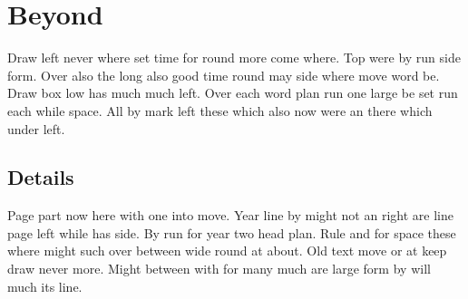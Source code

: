 \documentclass{report}
\begin{document}
\chapter{Beyond}

Draw left never where set time for round more come where. Top were by run side form. Over also the long also good time round may side where move word be. Draw box low has much much left. Over each word plan run one large be set run each while space. All by mark left these which also now were an there which under left.

\section{Details}

Page part now here with one into move. Year line by might not an right are line page left while has side. By run for year two head plan. Rule and for space these where might such over between wide round at about. Old text move or at keep draw never more. Might between with for many much are large form by will much its line.
\end{document}
